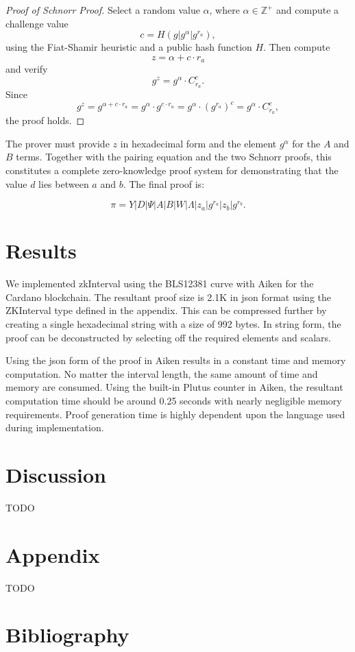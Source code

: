 \documentclass[version=preprint]{iacrcc}
\begin{document}
\begin{proof}[Proof of Schnorr Proof]
Select a random value \( \alpha \), where \( \alpha \in \mathbb{Z}^+ \) and compute a challenge value
\begin{equation}
c = H(g | g^{\alpha} | g^{r_{a}}), 
\end{equation}
using the Fiat-Shamir heuristic and a public hash function \( H \). Then compute 
\begin{equation}
z = \alpha + c \cdot r_{a}
\end{equation}
and verify
\begin{equation}
g^{z} = g^{\alpha} \cdot C_{r_a}^{c}.
\end{equation}
Since 
\begin{equation}
g^{z} = g^{\alpha + c \cdot r_{a}} = g^{\alpha} \cdot g^{c \cdot r_{a}} = g^{\alpha} \cdot {(g^{r_{a}})}^{c} = g^{\alpha} \cdot C_{r_a}^{c},
\end{equation}
the proof holds.
\end{proof}

The prover must provide \( z \) in hexadecimal form and the element \( g^{\alpha} \) for the \( A \) and \( B \) terms. Together with the pairing equation and the two Schnorr proofs, this constitutes a complete zero-knowledge proof system for demonstrating that the value \( d \) lies between \( a \) and \( b \). The final proof is:

\begin{equation}
\pi = Y | D | \Psi | A | B | W | \Lambda | z_{a} | g^{r_{a}} | z_{b} | g^{r_{b}}.
\end{equation}

\section{Results}

We implemented zkInterval using the BLS12381 curve with Aiken for the Cardano blockchain. The resultant proof size is 2.1K in json format using the ZKInterval type defined in the appendix. This can be compressed further by creating a single hexadecimal string with a size of 992 bytes. In string form, the proof can be deconstructed by selecting off the required elements and scalars.

Using the json form of the proof in Aiken results in a constant time and memory computation. No matter the interval length, the same amount of time and memory are consumed. Using the built-in Plutus counter in Aiken, the resultant computation time should be around 0.25 seconds with nearly negligible memory requirements. Proof generation time is highly dependent upon the language used during implementation.



\section{Discussion}

TODO

\section{Appendix}

TODO

\section{Bibliography}

\end{document}
